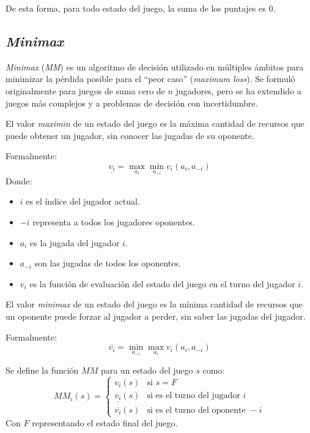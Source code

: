     De esta forma, para todo estado del juego, la suma de los puntajes es 0.

  \subsection{\textit{Minimax}}
    \textit{Minimax}\cite{wiki-minimax, neumann1928theorie, fan1953minimax} (\textit{MM}) es un 
    algoritmo de decisión utilizado en múltiples ámbitos para minimizar la pérdida posible para 
    el \enquote{peor caso} (\textit{maximum loss}). 
    Se formuló originalmente para juegos de suma cero de \(n\) jugadores, pero se ha extendido a
    juegos más complejos y a problemas de decisión con incertidumbre.

    \begin{definition}
      El valor \textit{maximin} de un estado del juego es la máxima cantidad de recursos que puede 
      obtener un jugador, sin conocer las jugadas de su oponente.

      Formalmente:
      \[
        \underline{v_{i}} = \max_{a_{i}}\min_{a_{-i}}v_{i}(a_{i},a_{-i})
      \]
      Donde:
      \begin{itemize}
        \item \(i\) es el índice del jugador actual.
        \item \(-i\) representa a todos los jugadores oponentes.
        \item \(a_i\) es la jugada del jugador \(i\).
        \item \(a_{-i}\) son las jugadas de todos los oponentes.
        \item \(v_i\) es la función de evaluación del estado del juego en el turno del jugador 
          \(i\).
      \end{itemize}
    \end{definition}

    \begin{definition}
      El valor \textit{minimax} de un estado del juego es la mínima cantidad de recursos que un 
      oponente puede forzar al jugador a perder, sin saber las jugadas del jugador.
      
      Formalmente:
      \[
        \overline{v_{i}} = 
          \min_{a_{-i}}\max_{a_{i}}{v_{i}(a_{i}, a_{-i})}
      \]
    \end{definition}

    \begin{definition}
      Se define la función \(MM\) para un estado del juego \(s\) como:
      \[
        MM_i(s) = \begin{cases}
          v_i(s) & \text{si } s = F  \\
          \underline{v_{i}}(s) & \text{si es el turno del jugador } i \\
          \overline{v_{i}}(s) & \text{si es el turno del oponente } -i
        \end{cases}  
      \]
      Con \(F\) representando el estado final del juego.
    \end{definition}

